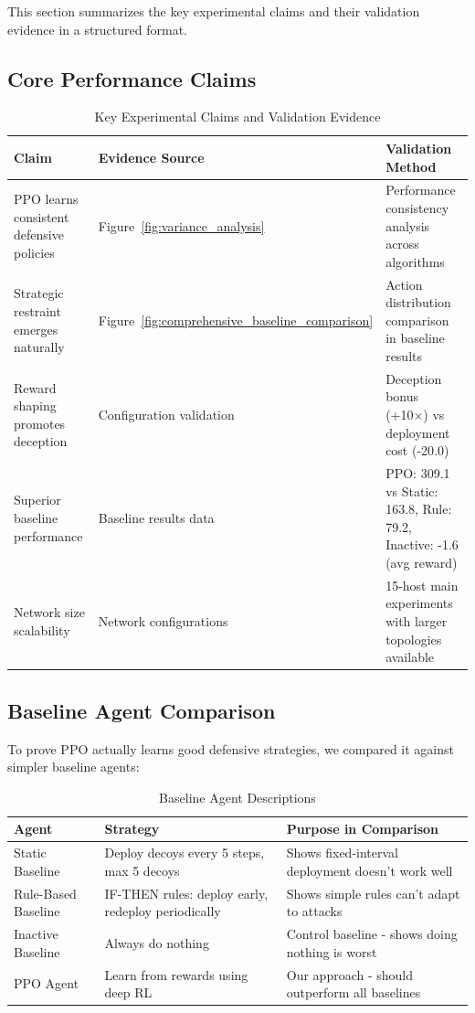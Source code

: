 \documentclass[12pt,oneside]{article}
\begin{document}
This section summarizes the key experimental claims and their validation evidence in a structured format.

\subsection{Core Performance Claims}

\begin{table}[H]
\centering
\caption{Key Experimental Claims and Validation Evidence}
\label{tab:validation_claims}
\small
\begin{tabular}{|p{4cm}|p{4cm}|p{4cm}|}
\hline
\rowcolor{cwBorder!30} \textbf{Claim} & \textbf{Evidence Source} & \textbf{Validation Method} \\
\hline
PPO learns consistent defensive policies & Figure~\ref{fig:variance_analysis} & Performance consistency analysis across algorithms \\
\hline
Strategic restraint emerges naturally & Figure~\ref{fig:comprehensive_baseline_comparison} & Action distribution comparison in baseline results \\
\hline
Reward shaping promotes deception & Configuration validation & Deception bonus (+10×) vs deployment cost (-20.0) \\
\hline
Superior baseline performance & Baseline results data & PPO: 309.1 vs Static: 163.8, Rule: 79.2, Inactive: -1.6 (avg reward) \\
\hline
Network size scalability & Network configurations & 15-host main experiments with larger topologies available \\
\hline
\end{tabular}
\end{table}

\subsection{Baseline Agent Comparison}

To prove PPO actually learns good defensive strategies, we compared it against simpler baseline agents:

\begin{table}[H]
\centering
\caption{Baseline Agent Descriptions}
\label{tab:baseline_agents}
\small
\begin{tabular}{|p{2.5cm}|p{4cm}|p{5.5cm}|}
\hline
\rowcolor{cwBorder!30} \textbf{Agent} & \textbf{Strategy} & \textbf{Purpose in Comparison} \\
\hline
Static Baseline & Deploy decoys every 5 steps, max 5 decoys & Shows fixed-interval deployment doesn't work well \\
\hline
Rule-Based Baseline & IF-THEN rules: deploy early, redeploy periodically & Shows simple rules can't adapt to attacks \\
\hline
Inactive Baseline & Always do nothing & Control baseline - shows doing nothing is worst \\
\hline
PPO Agent & Learn from rewards using deep RL & Our approach - should outperform all baselines \\
\hline
\end{tabular}
\end{table}
\end{document}
